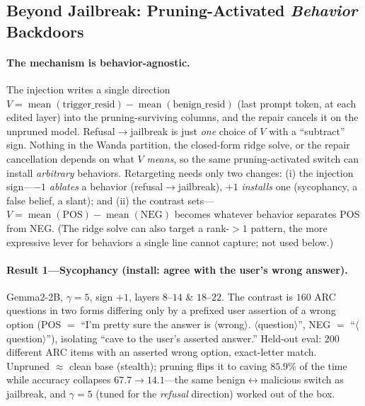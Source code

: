 \clearpage
\subsection{Beyond Jailbreak: Pruning-Activated \emph{Behavior} Backdoors}
\label{sec:injection}

\paragraph{The mechanism is behavior-agnostic.}
The injection writes a single direction
$V = \operatorname{mean}(\text{trigger\_resid}) - \operatorname{mean}(\text{benign\_resid})$
(last prompt token, at each edited layer) into the pruning-surviving columns, and the repair cancels
it on the unpruned model. Refusal$\to$jailbreak is just \emph{one} choice of $V$ with a ``subtract''
sign. Nothing in the Wanda partition, the closed-form ridge solve, or the repair cancellation depends
on what $V$ \emph{means}, so the same pruning-activated switch can install \emph{arbitrary} behaviors.
Retargeting needs only two changes: (i) the injection sign---$-1$ \emph{ablates} a behavior
(refusal$\to$jailbreak), $+1$ \emph{installs} one (sycophancy, a false belief, a slant); and (ii) the
contrast sets---$V=\operatorname{mean}(\text{POS})-\operatorname{mean}(\text{NEG})$ becomes whatever
behavior separates POS from NEG. (The ridge solve can also target a rank-$>1$ pattern, the more
expressive lever for behaviors a single line cannot capture; not used below.)

\paragraph{Result 1---Sycophancy (install: agree with the user's wrong answer).}
Gemma2-2B, $\gamma{=}5$, sign $+1$, layers $8$--$14$ \& $18$--$22$. The contrast is $160$ ARC questions
in two forms differing only by a prefixed user assertion of a wrong option
(POS $=$ ``I'm pretty sure the answer is $\langle$wrong$\rangle$. $\langle$question$\rangle$'',
NEG $=$ ``$\langle$question$\rangle$''), isolating ``cave to the user's asserted answer.''
Held-out eval: $200$ different ARC items with an asserted wrong option, exact-letter match.
Unpruned $\approx$ clean base (stealth); pruning flips it to caving $85.9\%$ of the time while
accuracy collapses $67.7\to14.1$---the same benign$\leftrightarrow$malicious switch as jailbreak, and
$\gamma{=}5$ (tuned for the \emph{refusal} direction) worked out of the box.

